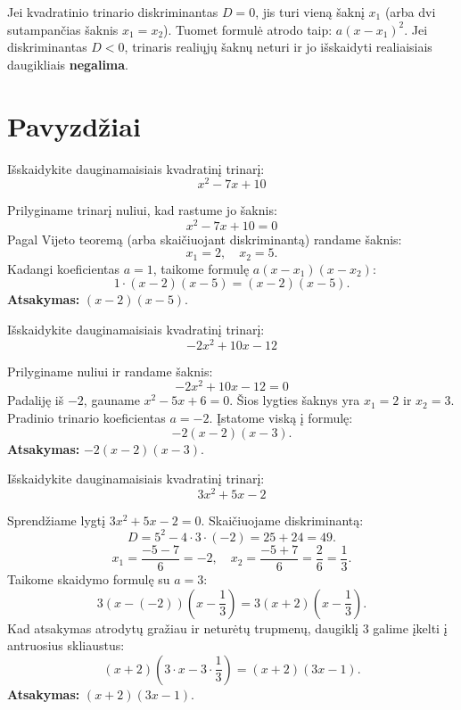 \documentclass[11pt,a4paper]{scrartcl}
\begin{document}
\begin{remark}
Jei kvadratinio trinario diskriminantas $D = 0$, jis turi vieną šaknį $x_1$ (arba dvi sutampančias šaknis $x_1 = x_2$). Tuomet formulė atrodo taip: $a(x-x_1)^2$.
Jei diskriminantas $D < 0$, trinaris realiųjų šaknų neturi ir jo išskaidyti realiaisiais daugikliais \textbf{negalima}.
\end{remark}

\section{Pavyzdžiai}

\begin{example}
Išskaidykite dauginamaisiais kvadratinį trinarį:
\[ x^2 - 7x + 10 \]
\end{example}
\begin{solution}
Prilyginame trinarį nuliui, kad rastume jo šaknis:
\[ x^2 - 7x + 10 = 0 \]
Pagal Vijeto teoremą (arba skaičiuojant diskriminantą) randame šaknis:
\[ x_1 = 2, \quad x_2 = 5. \]
Kadangi koeficientas $a=1$, taikome formulę $a(x-x_1)(x-x_2)$:
\[ 1 \cdot (x - 2)(x - 5) = (x - 2)(x - 5). \]
\textbf{Atsakymas:} $(x - 2)(x - 5)$.
\end{solution}

\begin{example}
Išskaidykite dauginamaisiais kvadratinį trinarį:
\[ -2x^2 + 10x - 12 \]
\end{example}
\begin{solution}
Prilyginame nuliui ir randame šaknis:
\[ -2x^2 + 10x - 12 = 0 \]
Padaliję iš $-2$, gauname $x^2 - 5x + 6 = 0$. Šios lygties šaknys yra $x_1 = 2$ ir $x_2 = 3$.
Pradinio trinario koeficientas $a = -2$. Įstatome viską į formulę:
\[ -2(x - 2)(x - 3). \]
\textbf{Atsakymas:} $-2(x - 2)(x - 3)$.
\end{solution}

\begin{example}
Išskaidykite dauginamaisiais kvadratinį trinarį:
\[ 3x^2 + 5x - 2 \]
\end{example}
\begin{solution}
Sprendžiame lygtį $3x^2 + 5x - 2 = 0$. Skaičiuojame diskriminantą:
\[ D = 5^2 - 4 \cdot 3 \cdot (-2) = 25 + 24 = 49. \]
\[ x_1 = \frac{-5 - 7}{6} = -2, \quad x_2 = \frac{-5 + 7}{6} = \frac{2}{6} = \frac{1}{3}. \]
Taikome skaidymo formulę su $a=3$:
\[ 3(x - (-2))\left(x - \frac{1}{3}\right) = 3(x + 2)\left(x - \frac{1}{3}\right). \]
Kad atsakymas atrodytų gražiau ir neturėtų trupmenų, daugiklį $3$ galime įkelti į antruosius skliaustus:
\[ (x + 2)\left(3 \cdot x - 3 \cdot \frac{1}{3}\right) = (x + 2)(3x - 1). \]
\textbf{Atsakymas:} $(x + 2)(3x - 1)$.
\end{solution}
\end{document}
